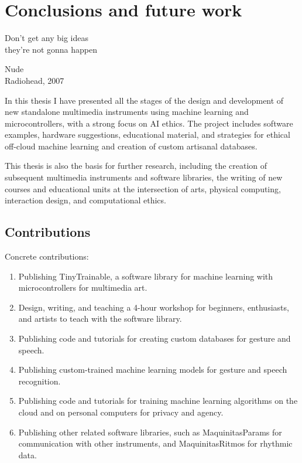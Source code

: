 \chapter{Conclusions and future work}

\epigraph{Don't get any big ideas \\ they're not gonna happen}{Nude \\ Radiohead, 2007}

In this thesis I have presented all the stages of the design and development of new standalone multimedia instruments using machine learning and microcontrollers, with a strong focus on AI ethics. The project includes software examples, hardware suggestions, educational material, and strategies for ethical off-cloud machine learning and creation of custom artisanal databases.

This thesis is also the basis for further research, including the creation of subsequent multimedia instruments and software libraries, the writing of new courses and educational units at the intersection of arts, physical computing, interaction design, and computational ethics.

\section{Contributions}

Concrete contributions:

\begin{enumerate}
  \item Publishing TinyTrainable, a software library for machine learning with microcontrollers for multimedia art.
  \item Design, writing, and teaching a 4-hour workshop for beginners, enthusiasts, and artists to teach with the software library.
  \item Publishing code and tutorials for creating custom databases for gesture and speech.
  \item Publishing custom-trained machine learning models for gesture and speech recognition.
  \item Publishing code and tutorials for training machine learning algorithms on the cloud and on personal computers for privacy and agency.
  \item Publishing other related software libraries, such as MaquinitasParams for communication with other instruments, and MaquinitasRitmos for rhythmic data.
\end{enumerate}


